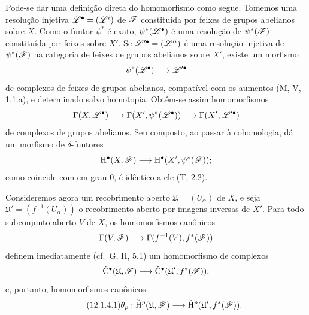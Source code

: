 \begin{env}[12.1.4]
\label{0.12.1.4}
Pode-se dar uma definição direta do homomorfismo
 como segue.
Tomemos uma resolução injetiva
$\mathscr{L}^\bullet=(\mathscr{L}^i)$ de $\mathscr{F}$ constituída por feixes de
grupos abelianos sobre $X$.
Como o funtor $\psi^*$ é exato,
$\psi^*(\mathscr{L}^\bullet)$ é uma resolução de $\psi^*(\mathscr{F})$
constituída por feixes sobre $X'$.
Se $\mathscr{L}'^\bullet=(\mathscr{L}'^i)$ é uma resolução injetiva de
$\psi^*(\mathscr{F})$ na categoria de feixes de grupos abelianos sobre
$X'$, existe um morfismo
\[
  \psi^*(\mathscr{L}^\bullet)\longrightarrow\mathscr{L}'^\bullet
\]
de complexos de feixes de grupos abelianos, compatível com os
aumentos (M, V, 1.1.a), e determinado salvo homotopia.
Obtêm-se assim homomorfismos
\[
  \Gamma(X,\mathscr{L}^\bullet)
  \longrightarrow
  \Gamma(X',\psi^*(\mathscr{L}^\bullet))
  \longrightarrow
  \Gamma(X',\mathscr{L}'^\bullet)
\]
de complexos de grupos abelianos.
Seu composto, ao passar à cohomologia, dá um morfismo de
$\delta$-funtores
\[
  \mathrm{H}^\bullet(X,\mathscr{F})
  \longrightarrow
  \mathrm{H}^\bullet(X',\psi^*(\mathscr{F}));
\]
como coincide com  em grau $0$, é idêntico a ele
(T, 2.2).

Consideremos agora um recobrimento aberto
$\mathfrak{U}=(U_\alpha)$ de $X$, e seja
$\mathfrak{U}'=(f^{-1}(U_\alpha))$ o recobrimento aberto por imagens inversas
de $X'$.
Para todo subconjunto aberto $V$ de $X$, os homomorfismos canônicos
\[
  \Gamma(V,\mathscr{F})
  \longrightarrow
  \Gamma(f^{-1}(V),f^*(\mathscr{F}))
\]
definem imediatamente (cf.\ G, II, 5.1) um homomorfismo de complexos
\[
  \check{\mathrm{C}}^\bullet(\mathfrak{U},\mathscr{F})
  \longrightarrow
  \check{\mathrm{C}}^\bullet(\mathfrak{U}',f^*(\mathscr{F})),
\]
e, portanto, homomorfismos canônicos
\[
\label{0.12.1.4.1}
\tag{12.1.4.1}
  \theta_p:
  \check{\HH}^p(\mathfrak{U},\sh{F})
  \longrightarrow
  \check{\HH}^p(\mathfrak{U}',f^*(\sh{F})).
\]


\end{env}
